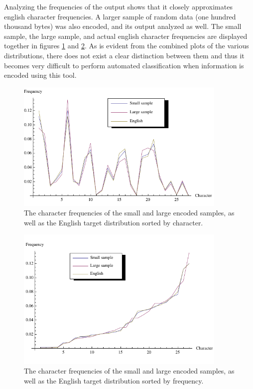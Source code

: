 \documentclass[12pt]{report}
\theoremstyle{remark}
\theoremstyle{definition}
\theoremstyle{definition}
\theoremstyle{definition}
\begin{document}
Analyzing the frequencies of the output shows that it closely approximates english character frequencies. A larger sample of random data (one hundred thousand bytes) was also encoded, and its output analyzed as well. The small sample, the large sample, and actual english character frequencies are displayed together in figures \ref{FIGURE_frequencies-bytop} and \ref{FIGURE_frequencies-bychar}. As is evident from the combined plots of the various distributions, there does not exist a clear distinction between them and thus it becomes very difficult to perform automated classification when information is encoded using this tool.

\begin{figure}
\centering
\includegraphics[width=0.9\textwidth]{figures/frequencies-bychar.pdf}
\caption[Plot of character frequencies by frequency]{The character frequencies of the small and large encoded samples, as well as the English target distribution sorted by character.}
\label{FIGURE_frequencies-bytop}
\end{figure}

\begin{figure}
\centering
\includegraphics[width=0.9\textwidth]{figures/frequencies-bytop.pdf}
\caption[Plot of character frequencies by character]{The character frequencies of the small and large encoded samples, as well as the English target distribution sorted by frequency.}
\label{FIGURE_frequencies-bychar}
\end{figure}
\end{document}
